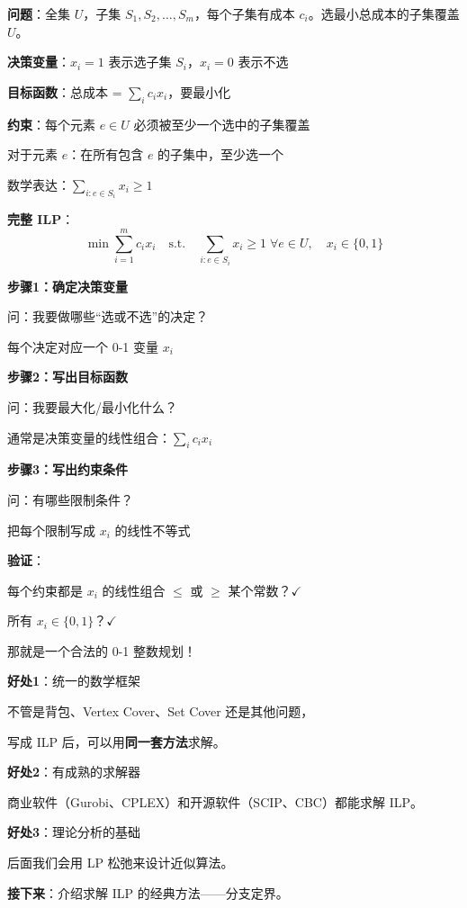 \documentclass[12pt, a4paper]{ctexart}
\begin{document}
\begin{blackboard}

\textbf{问题}：全集 $U$，子集 $S_1, S_2, \ldots, S_m$，每个子集有成本 $c_i$。选最小总成本的子集覆盖 $U$。

\textbf{决策变量}：$x_i = 1$ 表示选子集 $S_i$，$x_i = 0$ 表示不选

\textbf{目标函数}：总成本 = $\sum_i c_i x_i$，要最小化

\textbf{约束}：每个元素 $e \in U$ 必须被至少一个选中的子集覆盖

对于元素 $e$：在所有包含 $e$ 的子集中，至少选一个

数学表达：$\sum_{i: e \in S_i} x_i \geq 1$

\textbf{完整 ILP}：
\[
\min \sum_{i=1}^m c_i x_i \quad \text{s.t.} \quad \sum_{i: e \in S_i} x_i \geq 1 \; \forall e \in U, \quad x_i \in \{0, 1\}
\]

\end{blackboard}

\begin{blackboard}

\textbf{步骤1：确定决策变量}

问：我要做哪些``选或不选''的决定？

每个决定对应一个 0-1 变量 $x_i$

\textbf{步骤2：写出目标函数}

问：我要最大化/最小化什么？

通常是决策变量的线性组合：$\sum_i c_i x_i$

\textbf{步骤3：写出约束条件}

问：有哪些限制条件？

把每个限制写成 $x_i$ 的线性不等式

\textbf{验证}：

每个约束都是 $x_i$ 的线性组合 $\leq$ 或 $\geq$ 某个常数？$\checkmark$

所有 $x_i \in \{0, 1\}$？$\checkmark$

那就是一个合法的 0-1 整数规划！

\end{blackboard}

\begin{blackboard}

\textbf{好处1}：统一的数学框架

不管是背包、Vertex Cover、Set Cover 还是其他问题，

写成 ILP 后，可以用\textbf{同一套方法}求解。

\textbf{好处2}：有成熟的求解器

商业软件（Gurobi、CPLEX）和开源软件（SCIP、CBC）都能求解 ILP。

\textbf{好处3}：理论分析的基础

后面我们会用 LP 松弛来设计近似算法。

\textbf{接下来}：介绍求解 ILP 的经典方法——分支定界。

\end{blackboard}
\end{document}
